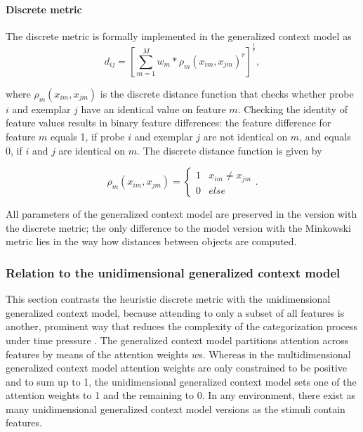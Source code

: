 \documentclass[a4paper,man,natbib]{apa6}
\begin{document}
\paragraph{Discrete metric}
The discrete metric is formally implemented in the generalized context model as 
\begin{equation}
d_{ij} = \left[\sum\limits_{m=1}^M w_{m}* \rho_{m}(x_{im}, x_{jm}) ^r\right]^\frac{1}{r},
\label{eq:distance}
\end{equation}

where $\rho_{m}(x_{im}, x_{jm})$ is the discrete distance function that checks whether probe $i$ and exemplar $j$ have an identical value on feature $m$. Checking the identity of feature values results in binary feature differences: the feature difference for feature $m$ equals 1, if probe $i$ and exemplar $j$ are not identical on $m$, and equals 0, if $i$ and $j$ are identical on $m$. The discrete distance function is given by

\begin{equation}
\rho_{m}(x_{im}, x_{jm}) = 
\begin{cases}
	1 & x_{im} \neq x_{jm} \\
	0 & else 
\end{cases}.
\end{equation}

All parameters of the generalized context model are preserved in the version with the discrete metric; the only difference to the model version with the Minkowski metric lies in the way how distances between objects are computed.

\subsubsection{Relation to the unidimensional generalized context model}
This section contrasts the heuristic discrete metric with the unidimensional generalized context model, because attending to only a subset of all features is another, prominent way that reduces the complexity of the categorization process under time pressure \citep{lamberts1995categorization, lamberts1998time, lamberts1999building, lamberts1999categorization, lamberts1997fast}. 
The generalized context model \citep{nosofsky1989further} partitions attention across features by means of the attention weights $w$s. Whereas in the multidimensional generalized context model attention weights are only constrained to be positive and to sum up to 1, the unidimensional generalized context model sets one of the attention weights to 1 and the remaining to 0. In any environment, there exist as many unidimensional generalized context model versions as the stimuli contain features. 
\end{document}
